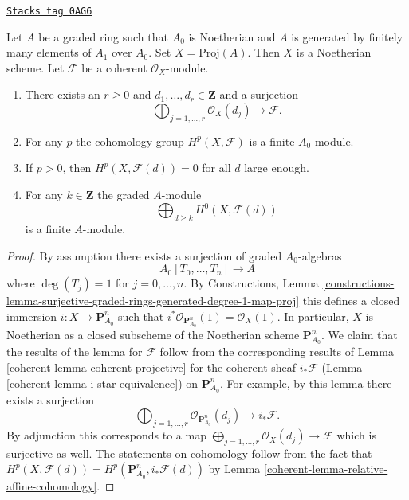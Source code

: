 \begin{lemma}
\label{coherent-lemma-coherent-on-proj}
\href{https://stacks.math.columbia.edu/tag/0AG6}{\texttt{Stacks tag 0AG6}}

Let $A$ be a graded ring such that $A_0$ is Noetherian and
$A$ is generated by finitely many elements of $A_1$ over $A_0$.
Set $X = \text{Proj}(A)$. Then $X$ is a Noetherian scheme.
Let $\mathcal{F}$ be a coherent $\mathcal{O}_X$-module.
\begin{enumerate}
\item There exists an $r \geq 0$ and
$d_1, \ldots, d_r \in \mathbf{Z}$ and a surjection
$$
\bigoplus\nolimits_{j = 1, \ldots, r} \mathcal{O}_X(d_j)
\longrightarrow \mathcal{F}.
$$
\item For any $p$ the cohomology group $H^p(X, \mathcal{F})$ is a finite
$A_0$-module.
\item If $p > 0$, then $H^p(X, \mathcal{F}(d)) = 0$ for all $d$ large enough.
\item For any $k \in \mathbf{Z}$ the graded $A$-module
$$
\bigoplus\nolimits_{d \geq k} H^0(X, \mathcal{F}(d))
$$
is a finite $A$-module.
\end{enumerate}
\end{lemma}

\begin{proof}

By assumption there exists a surjection of graded $A_0$-algebras
$$
A_0[T_0, \ldots, T_n] \longrightarrow A
$$
where $\deg(T_j) = 1$ for $j = 0, \ldots, n$. By Constructions, Lemma
\ref{constructions-lemma-surjective-graded-rings-generated-degree-1-map-proj}
this defines a closed immersion $i : X \to \mathbf{P}^n_{A_0}$
such that $i^*\mathcal{O}_{\mathbf{P}^n_{A_0}}(1) = \mathcal{O}_X(1)$.
In particular, $X$ is Noetherian as a closed subscheme of the Noetherian
scheme $\mathbf{P}^n_{A_0}$. We claim that the results of the lemma for
$\mathcal{F}$ follow from the corresponding
results of Lemma \ref{coherent-lemma-coherent-projective} for the coherent sheaf
$i_*\mathcal{F}$ (Lemma \ref{coherent-lemma-i-star-equivalence}) on
$\mathbf{P}^n_{A_0}$. For example, by this lemma there
exists a surjection
$$
\bigoplus\nolimits_{j = 1, \ldots, r} \mathcal{O}_{\mathbf{P}^n_{A_0}}(d_j)
\longrightarrow i_*\mathcal{F}.
$$
By adjunction this corresponds to a map
$\bigoplus_{j = 1, \ldots, r} \mathcal{O}_X(d_j) \longrightarrow \mathcal{F}$
which is surjective as well. The statements on cohomology follow from the
fact that
$H^p(X, \mathcal{F}(d)) = H^p(\mathbf{P}^n_{A_0}, i_*\mathcal{F}(d))$
by Lemma \ref{coherent-lemma-relative-affine-cohomology}.
\end{proof}

